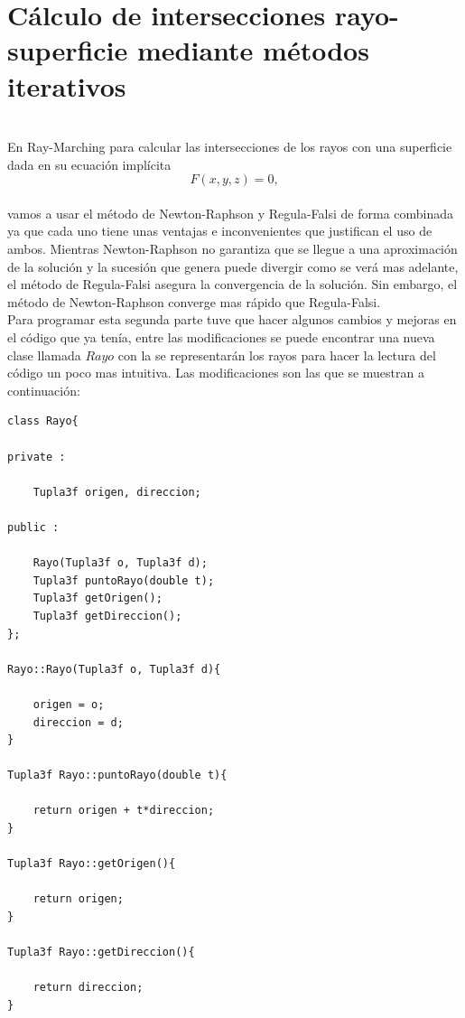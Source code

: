 \chapter{Cálculo de intersecciones rayo-superficie mediante métodos iterativos}

${ }$\\

En Ray-Marching para calcular las intersecciones de los rayos con una superficie dada en su ecuación implícita
${ }$\\
\[
	F(x,y,z) = 0,
\]
${ }$\\
vamos a usar el método de Newton-Raphson y Regula-Falsi de forma combinada ya que cada uno tiene unas ventajas e inconvenientes que justifican el uso de ambos. Mientras Newton-Raphson no garantiza que se llegue a una aproximación de la solución y la sucesión que genera puede divergir como se verá mas adelante, el método de Regula-Falsi asegura la convergencia de la solución. Sin embargo, el método de Newton-Raphson converge mas rápido que Regula-Falsi.
${ }$\\

Para programar esta segunda parte tuve que hacer algunos cambios y mejoras en el código que ya tenía, entre las modificaciones se puede encontrar una nueva clase llamada $Rayo$ con la se representarán los rayos para hacer la lectura del código un poco mas intuitiva. Las modificaciones son las que se muestran a continuación:
${ }$\\

\begin{lstlisting}[style=Consola]
class Rayo{
	
private :
	
	Tupla3f origen, direccion;
	
public :
	
	Rayo(Tupla3f o, Tupla3f d);
	Tupla3f puntoRayo(double t);
	Tupla3f getOrigen();
	Tupla3f getDireccion();
};
	
Rayo::Rayo(Tupla3f o, Tupla3f d){

	origen = o;
	direccion = d;
}
	
Tupla3f Rayo::puntoRayo(double t){

	return origen + t*direccion;
}
	
Tupla3f Rayo::getOrigen(){

	return origen;
}
	
Tupla3f Rayo::getDireccion(){

	return direccion;
}
\end{lstlisting}
${ }$\\



